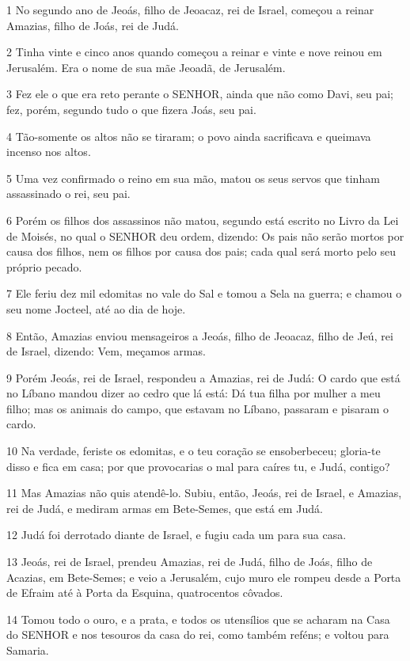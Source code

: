 \par 1 No segundo ano de Jeoás, filho de Jeoacaz, rei de Israel, começou a reinar Amazias, filho de Joás, rei de Judá.
\par 2 Tinha vinte e cinco anos quando começou a reinar e vinte e nove reinou em Jerusalém. Era o nome de sua mãe Jeoadã, de Jerusalém.
\par 3 Fez ele o que era reto perante o SENHOR, ainda que não como Davi, seu pai; fez, porém, segundo tudo o que fizera Joás, seu pai.
\par 4 Tão-somente os altos não se tiraram; o povo ainda sacrificava e queimava incenso nos altos.
\par 5 Uma vez confirmado o reino em sua mão, matou os seus servos que tinham assassinado o rei, seu pai.
\par 6 Porém os filhos dos assassinos não matou, segundo está escrito no Livro da Lei de Moisés, no qual o SENHOR deu ordem, dizendo: Os pais não serão mortos por causa dos filhos, nem os filhos por causa dos pais; cada qual será morto pelo seu próprio pecado.
\par 7 Ele feriu dez mil edomitas no vale do Sal e tomou a Sela na guerra; e chamou o seu nome Jocteel, até ao dia de hoje.
\par 8 Então, Amazias enviou mensageiros a Jeoás, filho de Jeoacaz, filho de Jeú, rei de Israel, dizendo: Vem, meçamos armas.
\par 9 Porém Jeoás, rei de Israel, respondeu a Amazias, rei de Judá: O cardo que está no Líbano mandou dizer ao cedro que lá está: Dá tua filha por mulher a meu filho; mas os animais do campo, que estavam no Líbano, passaram e pisaram o cardo.
\par 10 Na verdade, feriste os edomitas, e o teu coração se ensoberbeceu; gloria-te disso e fica em casa; por que provocarias o mal para caíres tu, e Judá, contigo?
\par 11 Mas Amazias não quis atendê-lo. Subiu, então, Jeoás, rei de Israel, e Amazias, rei de Judá, e mediram armas em Bete-Semes, que está em Judá.
\par 12 Judá foi derrotado diante de Israel, e fugiu cada um para sua casa.
\par 13 Jeoás, rei de Israel, prendeu Amazias, rei de Judá, filho de Joás, filho de Acazias, em Bete-Semes; e veio a Jerusalém, cujo muro ele rompeu desde a Porta de Efraim até à Porta da Esquina, quatrocentos côvados.
\par 14 Tomou todo o ouro, e a prata, e todos os utensílios que se acharam na Casa do SENHOR e nos tesouros da casa do rei, como também reféns; e voltou para Samaria.
